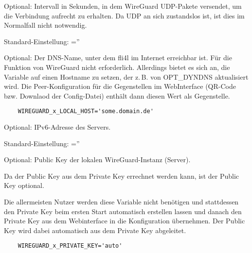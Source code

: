 \begin{description}
Optional: Intervall in Sekunden, in dem WireGuard UDP-Pakete
versendet, um die Verbindung aufrecht zu erhalten. Da UDP an sich
zustandslos ist, ist dies im Normalfall nicht notwendig.




Standard-Einstellung: =''

Optional: Der DNS-Name, unter dem fli4l im Internet erreichbar ist.
Für die Funktion von WireGuard nicht erforderlich. Allerdings bietet
es sich an, die Variable auf einen Hostname zu setzen, der z.\,B. von
OPT\_DYNDNS aktualisiert wird. Die Peer-Konfiguration für die
Gegenstellen im WebInterface (QR-Code bzw. Downlaod der Config-Datei)
enthält dann diesen Wert als Gegenstelle.

\begin{example}
\begin{verbatim}
    WIREGUARD_x_LOCAL_HOST='some.domain.de'
\end{verbatim}
\end{example}



Optional: IPv6-Adresse des Servers.



Standard-Einstellung: =''

Optional: Public Key der lokalen WireGuard-Instanz (Server).

Da der Public Key aus dem Private Key errechnet werden kann, ist der Public Key
optional.

Die allermeisten Nutzer werden diese Variable nicht benötigen und stattdessen den
Private Key beim ersten Start automatisch erstellen lassen und danach den Private
Key aus dem Webinterface in die Konfiguration übernehmen. Der Public Key wird dabei
automatisch aus dem Private Key abgeleitet.

\begin{example}
\begin{verbatim}
    WIREGUARD_x_PRIVATE_KEY='auto'
\end{verbatim}
\end{example}



\end{description}
